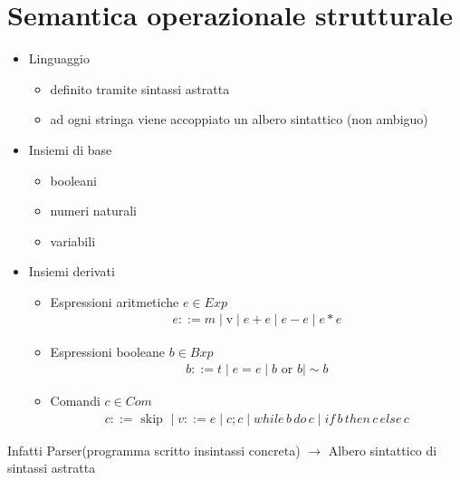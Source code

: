 \documentclass[a4paper,12pt]{article}
\begin{document}
\section{Semantica operazionale strutturale}
\begin{itemize}
  \item Linguaggio
  \begin{itemize}
    \item definito tramite sintassi astratta
    \item ad ogni stringa viene accoppiato un albero sintattico (non ambiguo)
  \end{itemize}
  \item Insiemi di base
  \begin{itemize}
    \item booleani 
    \item numeri naturali
    \item variabili
  \end{itemize}
  \item Insiemi derivati
  \begin{itemize}
    \item Espressioni aritmetiche $e \in Exp$ \\
    \begin{align*}
      e ::= m \mid \text{v} \mid e+e \mid e-e \mid e*e 
    \end{align*}
    \item Espressioni booleane $b \in Bxp$
    \begin{align*}
      b ::= t \mid e=e \mid b \text{ or } b \mid \sim b
    \end{align*}
    \item Comandi $c \in Com$
    \begin{align*}
      c ::=  \text{ skip }\mid v ::= e \mid c;c \mid while \, b \, do\,  c \mid if \, b \, then \, c \, else \, c
    \end{align*}
  \end{itemize}
\end{itemize}
Infatti Parser(programma scritto insintassi concreta) $\to$ Albero sintattico di sintassi astratta \\
\end{document}
